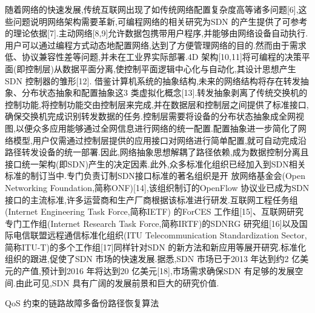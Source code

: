 随着网络的快速发展,传统互联网出现了如传统网络配置复杂度高等诸多问题[6],这些问题说明网络架构需要革新,可编程网络的相关研究为SDN 的产生提供了可参考的理论依据[7].主动网络[8,9]允许数据包携带用户程序,并能够由网络设备自动执行.用户可以通过编程方式动态地配置网络,达到了方便管理网络的目的.然而由于需求低、协议兼容性差等问题,并未在工业界实际部署.4D 架构[10,11]将可编程的决策平面(即控制层)从数据平面分离,使控制平面逻辑中心化与自动化,其设计思想产生SDN 控制器的雏形[12].
借鉴计算机系统的抽象结构,未来的网络结构将存在转发抽象、分布状态抽象和配置抽象这3 类虚拟化概念[13].转发抽象剥离了传统交换机的控制功能,将控制功能交由控制层来完成,并在数据层和控制层之间提供了标准接口,确保交换机完成识别转发数据的任务.控制层需要将设备的分布状态抽象成全网视图,以便众多应用能够通过全网信息进行网络的统一配置.配置抽象进一步简化了网络模型,用户仅需通过控制层提供的应用接口对网络进行简单配置,就可自动完成沿路径转发设备的统一部署.因此,网络抽象思想解耦了路径依赖,成为数据控制分离且接口统一架构(即SDN)产生的决定因素.此外,众多标准化组织已经加入到SDN相关标准的制订当中.专门负责订制SDN接口标准的著名组织是开
放网络基金会(Open Networking Foundation,简称ONF)[14],该组织制订的OpenFlow 协议业已成为SDN 接口的主流标准,许多运营商和生产厂商根据该标准进行研发.互联网工程任务组(Internet Engineering Task Force,简称IETF) 的ForCES 工作组[15]、互联网研究专门工作组(Internet Research Task Force,简称IRTF)的SDNRG 研究组[16]以及国际电信联盟远程通信标准化组织(ITU Telecommunication Standardization Sector,简称ITU-T)的多个工作组[17]同样针对SDN 的新方法和新应用等展开研究.标准化组织的跟进,促使了SDN 市场的快速发展.据悉,SDN 市场已于2013 年达到约2 亿美元的产值,预计到2016 年将达到20 亿美元[18],市场需求确保SDN 有足够的发展空间.由此可见,SDN 具有广阔的发展前景和巨大的研究价值.

QoS 约束的链路故障多备份路径恢复算法


